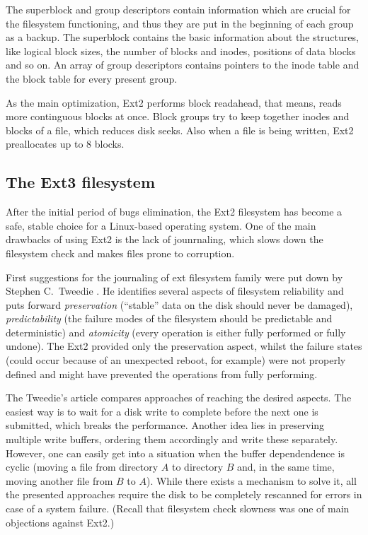 \documentclass{acm_proc_article-sp}
\begin{document}
The superblock and group descriptors contain information which are crucial for the filesystem functioning, and thus they are put in the beginning of each group as a backup. The superblock contains the basic information about the structures, like logical block sizes, the number of blocks and inodes, positions of data blocks and so on. An array of group descriptors contains pointers to the inode table and the block table for every present group.

As the main optimization, Ext2 performs block readahead, that means, reads more continguous blocks at once. Block groups try to keep together inodes and blocks of a file, which reduces disk seeks. Also when a file is being written, Ext2 preallocates up to 8 blocks.

\subsection{The Ext3 filesystem}

After the initial period of bugs elimination, the Ext2 filesystem has become a safe, stable choice for a Linux-based operating system. One of the main drawbacks of using Ext2 is the lack of jounrnaling, which slows down the filesystem check and makes files prone to corruption.

First suggestions for the journaling of ext filesystem family were put down by Stephen C.\ Tweedie \cite{extjournal}. He identifies several aspects of filesystem reliability and puts forward {\it preservation} (``stable'' data on the disk should never be damaged), {\it predictability} (the failure modes of the filesystem should be predictable and deterministic) and {\it atomicity} (every operation is either fully performed or fully undone). The Ext2 provided only the preservation aspect, whilst the failure states (could occur because of an unexpected reboot, for example) were not properly defined and might have prevented the operations from fully performing.

The Tweedie's article \cite{extjournal} compares approaches of reaching the desired aspects. The easiest way is to wait for a disk write to complete before the next one is submitted, which breaks the performance. Another idea lies in preserving multiple write buffers, ordering them accordingly and write these separately. However, one can easily get into a situation when the buffer dependendence is cyclic (moving a file from directory $A$ to directory $B$ and, in the same time, moving another file from $B$ to $A$). While there exists a mechanism to solve it, all the presented approaches require the disk to be completely rescanned for errors in case of a system failure. (Recall that filesystem check slowness was one of main objections against Ext2.)
\end{document}
